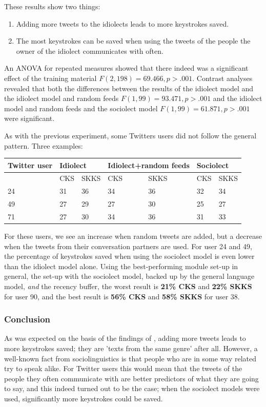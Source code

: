 \documentclass[12pt]{article}
\let\originaltable\table
\let\endoriginaltable\endtable
\renewenvironment{table}[1][ht]{%
  \originaltable[#1]
  \centering}%
  {\endoriginaltable}
\begin{document}
These results show two things:

\begin{enumerate}
\item Adding more tweets to the idiolects leads to more keystrokes saved.
\item The most keystrokes can be saved when using the tweets of the people the owner of the idiolect communicates with often.
\end{enumerate}

An ANOVA for repeated measures showed that there indeed was a significant effect of the training material $F(2,198) = 69.466, p > .001$. Contrast analyses revealed that both the differences between the results of the idiolect model and the idiolect model and random feeds $F(1,99) = 93.471, p > .001$ and the idiolect model and random feeds and the sociolect model $F(1,99) = 61.871, p > .001$ were significant.

As with the previous experiment, some Twitters users did not follow the general pattern. Three examples:

\begin{table}[H] 
\centering
\begin{tabular}{l|llllll} 
Twitter user&\multicolumn{2}{l}{Idiolect}&\multicolumn{2}{l}{Idiolect+random feeds}&\multicolumn{2}{l}{Sociolect}\\
\hline
&CKS&SKKS&CKS&SKKS&CKS&SKKS\\
24&31&36&34&36&32&34\\
49&27&29&27&30&25&27\\
71&27&30&34&36&31&33\\
\end{tabular} 
\caption{Percentage of keystrokes saved for 3 individual Twitter users, using the the idiolect, control and sociolect models}
\end{table}

For these users, we see an increase when random tweets are added, but a decrease when the tweets from their conversation partners are used. For user 24 and 49, the percentage of keystrokes saved when using the sociolect model is even lower than the idiolect model alone.  Using the best-performing module set-up in general, the set-up with the sociolect model, backed up by the general language model, \emph{and} the recency buffer, the worst result is \textbf{21\% CKS} and \textbf{22\% SKKS} for user 90, and the best result is \textbf{56\% CKS} and \textbf{58\% SKKS} for user 38.

\subsubsection{Conclusion}
As was expected on the basis of the findings of , adding more tweets leads to more keystrokes saved; they are 'texts from the same genre' after all. However, a well-known fact from sociolinguistics is that people who are in some way related try to speak alike. For Twitter users this would mean that the tweets of the people they often communicate with are better predictors of what they are going to say, and this indeed turned out to be the case; when the sociolect models were used, significantly more keystrokes could be saved.
\end{document}
